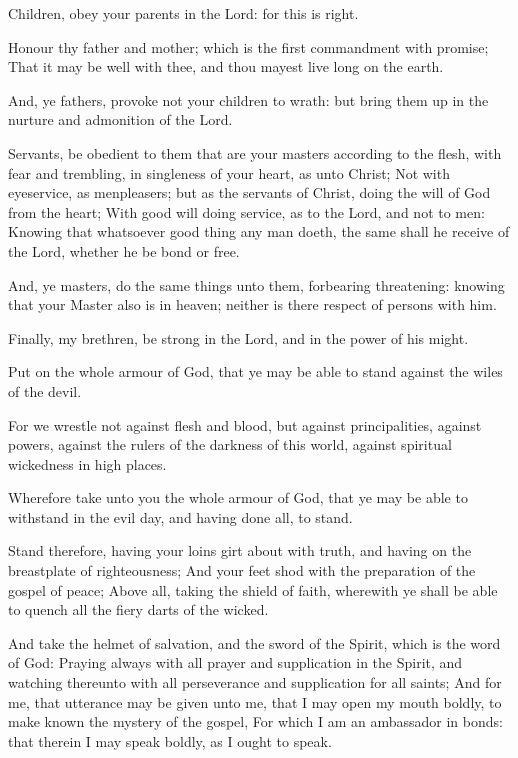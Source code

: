 \Chapter
\Verse Children, obey your parents in the Lord: for this is right.

\Verse Honour thy father and mother; which is the first commandment with promise; \Verse That it may be well with thee, and thou mayest live long on the earth.

\Verse And, ye fathers, provoke not your children to wrath: but bring them up in the nurture and admonition of the Lord.

\Verse Servants, be obedient to them that are your masters according to the flesh, with fear and trembling, in singleness of your heart, as unto Christ; \Verse Not with eyeservice, as menpleasers; but as the servants of Christ, doing the will of God from the heart; \Verse With good will doing service, as to the Lord, and not to men: \Verse Knowing that whatsoever good thing any man doeth, the same shall he receive of the Lord, whether he be bond or free.

\Verse And, ye masters, do the same things unto them, forbearing threatening: knowing that your Master also is in heaven; neither is there respect of persons with him.

\Verse Finally, my brethren, be strong in the Lord, and in the power of his might.

\Verse Put on the whole armour of God, that ye may be able to stand against the wiles of the devil.

\Verse For we wrestle not against flesh and blood, but against principalities, against powers, against the rulers of the darkness of this world, against spiritual wickedness in high places.

\Verse Wherefore take unto you the whole armour of God, that ye may be able to withstand in the evil day, and having done all, to stand.

\Verse Stand therefore, having your loins girt about with truth, and having on the breastplate of righteousness; \Verse And your feet shod with the preparation of the gospel of peace; \Verse Above all, taking the shield of faith, wherewith ye shall be able to quench all the fiery darts of the wicked.

\Verse And take the helmet of salvation, and the sword of the Spirit, which is the word of God: \Verse Praying always with all prayer and supplication in the Spirit, and watching thereunto with all perseverance and supplication for all saints; \Verse And for me, that utterance may be given unto me, that I may open my mouth boldly, to make known the mystery of the gospel, \Verse For which I am an ambassador in bonds: that therein I may speak boldly, as I ought to speak.

